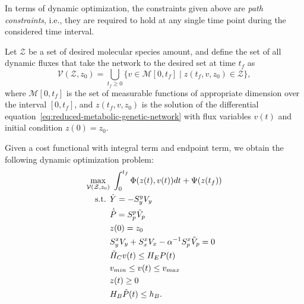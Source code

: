 \documentclass[a4paper,11pt,DIV12]{scrartcl}
\theoremstyle{remark}
\begin{document}
In terms of dynamic optimization, the constraints given above are \emph{path constraints}, i.e., they are required to hold at any single time point during the considered time interval.

Let $\mathcal Z$ be a set of desired molecular species amount, and define the set of all dynamic fluxes that take the network to the desired set at time $t_f$ as
\begin{equation}
  \label{eq:admissible-fluxes}
  \mathcal V(\mathcal Z,z_0) = \bigcup_{t_f \geq 0} \{ v \in \mathcal{M}[0,t_f] \mid z(t_f,v,z_0) \in \mathcal Z \},
\end{equation}
where $\mathcal M[0,t_f]$ is the set of measurable functions of appropriate dimension over the interval $[0,t_f]$, and $z(t_f,v,z_0)$ is the solution of the differential equation~\eqref{eq:reduced-metabolic-genetic-network} with flux variables $v(t)$ and initial condition $z(0) = z_0$.

Given a cost functional with integral term and endpoint term, we obtain the following dynamic optimization problem:
\begin{equation}
  \label{eq:metabolic-opt-problem}
  \begin{aligned}
    \max_{\mathcal V(\mathcal Z, z_0)} &\ \int_{0}^{t_f} \Phi(z(t),v(t)) dt + \Psi(z(t_f)) \\
    \textnormal{s.t. } & \dot Y = - S^y_y V_y \\
    & \dot{\tilde P} = S^p_p \tilde V_p \\
    & z(0) = z_0 \\
    & S^x_y V_y + S^x_x V_x - \alpha^{-1} S^x_p \tilde V_p = 0 \\
    & \tilde H_C v(t) \leq H_E P(t) \\
    & v_{min} \leq v(t) \leq v_{max} \\
    & z(t) \geq 0 \\
    & H_B \tilde P(t) \leq h_B.
  \end{aligned}
\end{equation}
\end{document}
